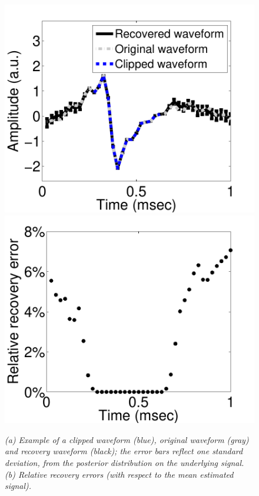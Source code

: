 \documentclass[journal]{IEEEtran}
\begin{document}

\begin{figure}[!htbp]
\centering

   \includegraphics[scale=0.28,angle=0] {figs_new/Recovery_waveform.pdf}
% 
   \includegraphics[scale=0.28,angle=90] {figs_new/Relative_recovery_errors.pdf}
   \label{fig:Relative_Error}
  \caption{\small \emph{ (a) Example of a clipped waveform (blue), original waveform (gray) and
  recovery waveform (black); the error bars reflect one standard deviation, from the posterior distribution on the underlying signal. (b) Relative recovery errors (with respect to the mean estimated signal).
   }}
\end{figure}
\end{document}
